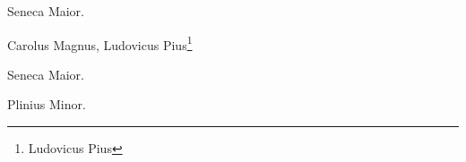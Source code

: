 \documentclass{article}
\begin{document}
\begin{ledgroup}
\beginnumbering
\pstart
Seneca Maior.
\pend
\endnumbering
\end{ledgroup}
\setcounter{footnote}{10}

Carolus Magnus, 
Ludovicus Pius\footnote{Ludovicus Pius}

\setcounter{footnoteA}{4}
\begin{pairs}
\begin{Leftside}
\beginnumbering
\pstart
Seneca Maior.
\pend
\endnumbering
\end{Leftside}

\begin{Rightside}
\beginnumbering
\pstart
Plinius Minor.
\pend
\endnumbering
\end{Rightside}

\end{pairs}
\Columns

\printindex[pers]
\end{document}
